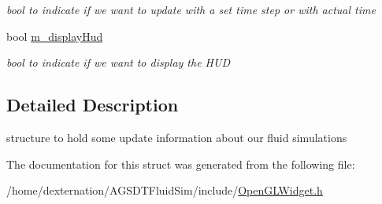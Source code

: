 \begin{DoxyCompactItemize}
\begin{DoxyCompactList}\small\item\em bool to indicate if we want to update with a set time step or with actual time \end{DoxyCompactList}\item 
\hypertarget{struct_open_g_l_widget_1_1fluid_sim_props_a466fa489adaefe2e54cc8ea3b1f64af8}{bool \hyperlink{struct_open_g_l_widget_1_1fluid_sim_props_a466fa489adaefe2e54cc8ea3b1f64af8}{m\-\_\-display\-Hud}}\label{struct_open_g_l_widget_1_1fluid_sim_props_a466fa489adaefe2e54cc8ea3b1f64af8}

\begin{DoxyCompactList}\small\item\em bool to indicate if we want to display the H\-U\-D \end{DoxyCompactList}\end{DoxyCompactItemize}


\subsection{Detailed Description}
structure to hold some update information about our fluid simulations 

The documentation for this struct was generated from the following file\-:\begin{DoxyCompactItemize}
\item 
/home/dexternation/\-A\-G\-S\-D\-T\-Fluid\-Sim/include/\hyperlink{_open_g_l_widget_8h}{Open\-G\-L\-Widget.\-h}\end{DoxyCompactItemize}
